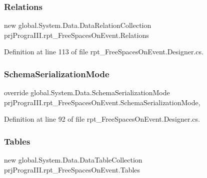 \subsubsection{\texorpdfstring{Relations}{Relations}}
{\footnotesize\ttfamily new global.\+System.\+Data.\+Data\+Relation\+Collection prj\+Progra\+I\+I\+I.\+rpt\+\_\+\+Free\+Spaces\+On\+Event.\+Relations\hspace{0.3cm}{\ttfamily [get]}}



Definition at line 113 of file rpt\+\_\+\+Free\+Spaces\+On\+Event.\+Designer.\+cs.

\hypertarget{classprj_progra_i_i_i_1_1rpt___free_spaces_on_event_a3d4323b4061baa4b851f98a713453a9e}{}\label{classprj_progra_i_i_i_1_1rpt___free_spaces_on_event_a3d4323b4061baa4b851f98a713453a9e} 
\subsubsection{\texorpdfstring{Schema\+Serialization\+Mode}{SchemaSerializationMode}}
{\footnotesize\ttfamily override global.\+System.\+Data.\+Schema\+Serialization\+Mode prj\+Progra\+I\+I\+I.\+rpt\+\_\+\+Free\+Spaces\+On\+Event.\+Schema\+Serialization\+Mode\hspace{0.3cm}{\ttfamily [get]}, {\ttfamily [set]}}



Definition at line 92 of file rpt\+\_\+\+Free\+Spaces\+On\+Event.\+Designer.\+cs.

\hypertarget{classprj_progra_i_i_i_1_1rpt___free_spaces_on_event_a35d29320c2fd4376fb32314ec9c3d186}{}\label{classprj_progra_i_i_i_1_1rpt___free_spaces_on_event_a35d29320c2fd4376fb32314ec9c3d186} 
\subsubsection{\texorpdfstring{Tables}{Tables}}
{\footnotesize\ttfamily new global.\+System.\+Data.\+Data\+Table\+Collection prj\+Progra\+I\+I\+I.\+rpt\+\_\+\+Free\+Spaces\+On\+Event.\+Tables\hspace{0.3cm}{\ttfamily [get]}}



